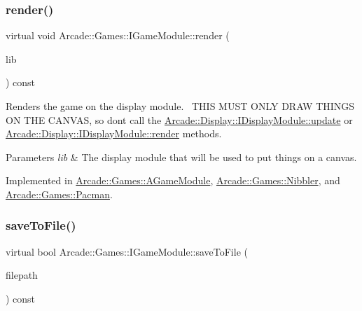 \subsubsection{\texorpdfstring{render()}{render()}}
{\footnotesize\ttfamily virtual void Arcade\+::\+Games\+::\+I\+Game\+Module\+::render (\begin{DoxyParamCaption}\item[{\mbox{\hyperlink{classArcade_1_1Display_1_1IDisplayModule}{Arcade\+::\+Display\+::\+I\+Display\+Module}} \&}]{lib }\end{DoxyParamCaption}) const\hspace{0.3cm}{\ttfamily [pure virtual]}}



Renders the game on the display module.~\newline
T\+H\+IS M\+U\+ST O\+N\+LY D\+R\+AW T\+H\+I\+N\+GS ON T\+HE C\+A\+N\+V\+AS, so don\textquotesingle{}t call the \mbox{\hyperlink{classArcade_1_1Display_1_1IDisplayModule_a1ca0c1052dccb78eb470e36e6f557e60}{Arcade\+::\+Display\+::\+I\+Display\+Module\+::update}} or \mbox{\hyperlink{classArcade_1_1Display_1_1IDisplayModule_a012f5804e7dc45515ef8e85e7ca8de5a}{Arcade\+::\+Display\+::\+I\+Display\+Module\+::render}} methods. 


\begin{DoxyParams}{Parameters}
{\em lib} & The display module that will be used to put things on a canvas. \\
\hline
\end{DoxyParams}


Implemented in \mbox{\hyperlink{classArcade_1_1Games_1_1AGameModule_a5897780d42d5faba3287c29b87f2b498}{Arcade\+::\+Games\+::\+A\+Game\+Module}}, \mbox{\hyperlink{classArcade_1_1Games_1_1Nibbler_afd52ee2fad66523b58f94f9eb582145e}{Arcade\+::\+Games\+::\+Nibbler}}, and \mbox{\hyperlink{classArcade_1_1Games_1_1Pacman_a624e0f9332f888fc585a17290cf80041}{Arcade\+::\+Games\+::\+Pacman}}.

\mbox{\label{classArcade_1_1Games_1_1IGameModule_a3cf053ce2f4ccfe13e9c10d8549f7c82}} 
\subsubsection{\texorpdfstring{saveToFile()}{saveToFile()}\hspace{0.1cm}{\footnotesize\ttfamily [1/2]}}
{\footnotesize\ttfamily virtual bool Arcade\+::\+Games\+::\+I\+Game\+Module\+::save\+To\+File (\begin{DoxyParamCaption}\item[{const std\+::string \&}]{filepath }\end{DoxyParamCaption}) const\hspace{0.3cm}{\ttfamily [pure virtual]}}



